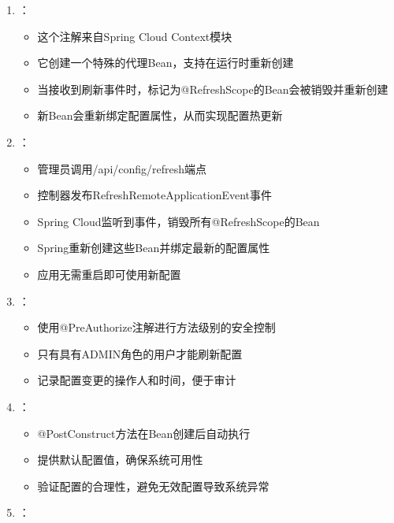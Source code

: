 \begin{enumerate}
\def\labelenumi{\arabic{enumi}.}
\tightlist
\item
  ：

  \begin{itemize}
  \tightlist
  \item
    这个注解来自Spring Cloud Context模块
  \item
    它创建一个特殊的代理Bean，支持在运行时重新创建
  \item
    当接收到刷新事件时，标记为@RefreshScope的Bean会被销毁并重新创建
  \item
    新Bean会重新绑定配置属性，从而实现配置热更新
  \end{itemize}
\item
  ：

  \begin{itemize}
  \tightlist
  \item
    管理员调用/api/config/refresh端点
  \item
    控制器发布RefreshRemoteApplicationEvent事件
  \item
    Spring Cloud监听到事件，销毁所有@RefreshScope的Bean
  \item
    Spring重新创建这些Bean并绑定最新的配置属性
  \item
    应用无需重启即可使用新配置
  \end{itemize}
\item
  ：

  \begin{itemize}
  \tightlist
  \item
    使用@PreAuthorize注解进行方法级别的安全控制
  \item
    只有具有ADMIN角色的用户才能刷新配置
  \item
    记录配置变更的操作人和时间，便于审计
  \end{itemize}
\item
  ：

  \begin{itemize}
  \tightlist
  \item
    @PostConstruct方法在Bean创建后自动执行
  \item
    提供默认配置值，确保系统可用性
  \item
    验证配置的合理性，避免无效配置导致系统异常
  \end{itemize}
\item
  ：


\end{enumerate}
